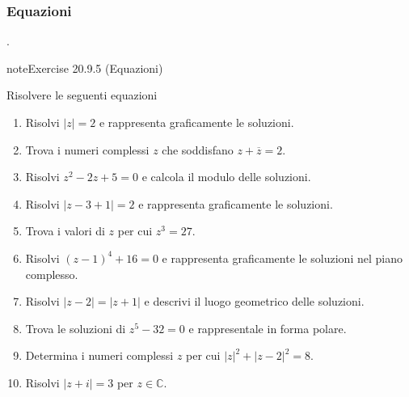 \documentclass[letterpaper,10pt,italian]{jupyterBook}
\begin{document}
\subsubsection{Equazioni}
\label{\detokenize{ch/algebra/complex-algebra-problems:equazioni}}\label{\detokenize{ch/algebra/complex-algebra-problems:math-hs-algebra-complex-problems-equations-eq}}
\sphinxAtStartPar
{\hyperref[\detokenize{ch/algebra/complex-algebra-sol:math-hs-algebra-complex-sol-equations-eq-sol}]{}}.
 \label{exercise:ch/algebra/complex-algebra-problems-exercise-4}

\begin{sphinxadmonition}{note}{Exercise 20.9.5 (Equazioni)}



\sphinxAtStartPar
Risolvere le seguenti equazioni
\begin{enumerate}
%
\item {} 
\sphinxAtStartPar
Risolvi \(|z| = 2\) e rappresenta graficamente le soluzioni.

\item {} 
\sphinxAtStartPar
Trova i numeri complessi \(z\) che soddisfano \(z + \overline{z} = 2\).

\item {} 
\sphinxAtStartPar
Risolvi \(z^2 - 2z + 5 = 0\) e calcola il modulo delle soluzioni.

\item {} 
\sphinxAtStartPar
Risolvi \(|z - 3 + 1| = 2\) e rappresenta graficamente le soluzioni.

\item {} 
\sphinxAtStartPar
Trova i valori di \(z\) per cui \(z^3 = 27\).

\item {} 
\sphinxAtStartPar
Risolvi \((z-1)^4 + 16 = 0\) e rappresenta graficamente le soluzioni nel piano complesso.

\item {} 
\sphinxAtStartPar
Risolvi \(|z - 2| = |z + 1|\) e descrivi il luogo geometrico delle soluzioni.

\item {} 
\sphinxAtStartPar
Trova le soluzioni di \(z^5 - 32 = 0\) e rappresentale in forma polare.

\item {} 
\sphinxAtStartPar
Determina i numeri complessi \(z\) per cui \(|z|^2 + |z - 2|^2 = 8\).

\item {} 
\sphinxAtStartPar
Risolvi \(|z + i| = 3\) per \(z \in \mathbb{C}\).


\end{enumerate}
\end{sphinxadmonition}
\end{document}
